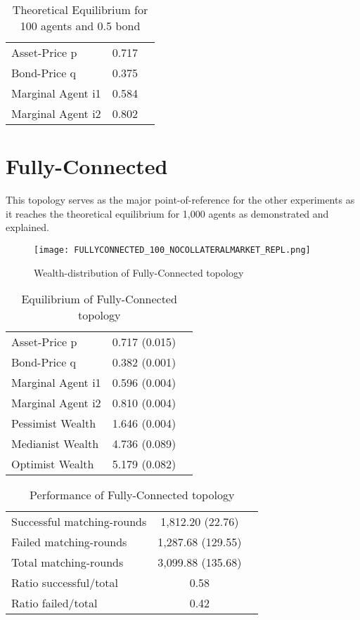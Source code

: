 \documentclass[Bachelorarbeit.tex]{subfiles}
\begin{document}
\begin{table}[H]
	\centering
	\caption{Theoretical Equilibrium for 100 agents and 0.5 bond}
	\begin{tabular} { l c r }
		\hline
		Asset-Price p & 0.717 \\
		Bond-Price q & 0.375 \\
		Marginal Agent i1 & 0.584 \\
		Marginal Agent i2 & 0.802 \\
		\hline
	\end{tabular}
	\label{tab:theoretical_equilibrium_100Agents_05Bond}
\end{table}

\section{Fully-Connected}
This topology serves as the major point-of-reference for the other experiments as it reaches the theoretical equilibrium for 1,000 agents as demonstrated and explained.

\begin{figure}[H]
	\centering
  \texttt{[image: FULLYCONNECTED\_100\_NOCOLLATERALMARKET\_REPL.png]}
	\caption{Wealth-distribution of Fully-Connected topology}
	\label{fig:wealth_FULLYCONNECTED_100_NOCOLLATERALMARKET_REPL}
\end{figure}

\begin{table}[H]
	\caption{Equilibrium of Fully-Connected topology}
	\centering
	\begin{tabular} { l c r }
		\hline
		Asset-Price p & 0.717 (0.015) \\
		Bond-Price q & 0.382 (0.001) \\
		Marginal Agent i1 & 0.596 (0.004) \\
		Marginal Agent i2 & 0.810 (0.004) \\
		\hline
		Pessimist Wealth & 1.646 (0.004) \\
		Medianist Wealth & 4.736 (0.089) \\
		Optimist Wealth & 5.179 (0.082) \\
		\hline
	\end{tabular}
	\label{tab:fullyconnected_equilibrium_100Agents_05Bond}
\end{table} 

\begin{table}[H]
	\caption{Performance of Fully-Connected topology}
	\centering
	\begin{tabular} { l c r }
		\hline
		Successful matching-rounds & 1,812.20 (22.76) \\
		Failed matching-rounds & 1,287.68 (129.55) \\
		Total matching-rounds & 3,099.88 (135.68) \\
		\hline
		Ratio successful/total & 0.58 \\
		Ratio failed/total & 0.42 \\
		\hline
	\end{tabular}
\end{table}
\end{document}
